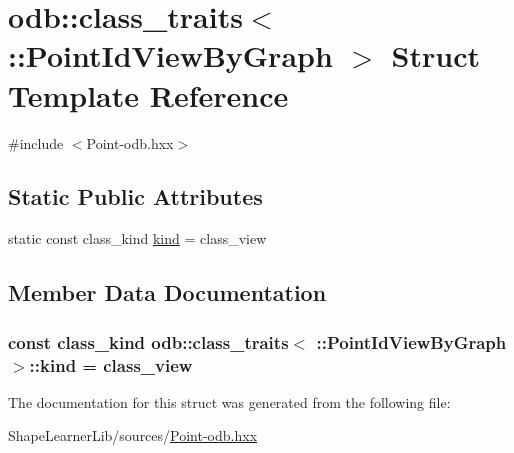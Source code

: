 \hypertarget{structodb_1_1class__traits_3_01_1_1_point_id_view_by_graph_01_4}{}\section{odb\+:\+:class\+\_\+traits$<$ \+:\+:Point\+Id\+View\+By\+Graph $>$ Struct Template Reference}
\label{structodb_1_1class__traits_3_01_1_1_point_id_view_by_graph_01_4}


{\ttfamily \#include $<$Point-\/odb.\+hxx$>$}

\subsection*{Static Public Attributes}
\begin{DoxyCompactItemize}
\item 
static const class\+\_\+kind \hyperlink{structodb_1_1class__traits_3_01_1_1_point_id_view_by_graph_01_4_a21e845b828e92b4c139fcf7c247992e6}{kind} = class\+\_\+view
\end{DoxyCompactItemize}


\subsection{Member Data Documentation}
\hypertarget{structodb_1_1class__traits_3_01_1_1_point_id_view_by_graph_01_4_a21e845b828e92b4c139fcf7c247992e6}{}
\subsubsection[{kind}]{\setlength{\rightskip}{0pt plus 5cm}const class\+\_\+kind odb\+::class\+\_\+traits$<$ \+::{\bf Point\+Id\+View\+By\+Graph} $>$\+::kind = class\+\_\+view\hspace{0.3cm}{\ttfamily [static]}}\label{structodb_1_1class__traits_3_01_1_1_point_id_view_by_graph_01_4_a21e845b828e92b4c139fcf7c247992e6}


The documentation for this struct was generated from the following file\+:\begin{DoxyCompactItemize}
\item 
Shape\+Learner\+Lib/sources/\hyperlink{_point-odb_8hxx}{Point-\/odb.\+hxx}\end{DoxyCompactItemize}
